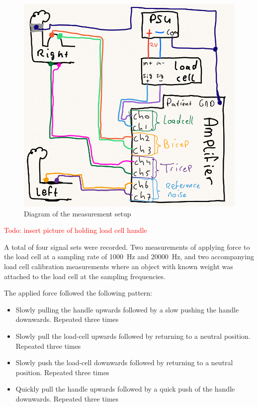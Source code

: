 \begin{figure}[h!t]
	\begin{center}
		\includegraphics[width=1.0\columnwidth]{images/measurement_setup_diagram.png}
	\end{center}
	\caption{Diagram of the measurement setup}
	\label{fig:measurement_setup_diagram}
\end{figure}

\textcolor{red}{Todo: insert picture of holding load cell handle}

A total of four signal sets were recorded. Two measurements of applying force to the load cell at a sampling rate of \SI{1000}{\hertz} and \SI{20000}{\hertz}, and two accompanying load cell calibration measurements where an object with known weight was attached to the load cell at the sampling frequencies.

The applied force followed the following pattern:
\begin{itemize}
    \item Slowly pulling the handle upwards followed by a slow pushing the handle downwards. Repeated three times
    \item Slowly pull the load-cell upwards followed by returning to a neutral position. Repeated three times
    \item Slowly push the load-cell downwards followed by returning to a neutral position. Repeated three times
    \item Quickly pull the handle upwards followed by a quick push of the handle downwards. Repeated three times
\end{itemize}

